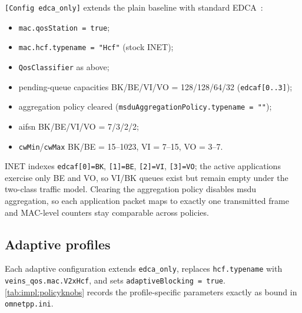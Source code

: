\label{sec:impl:edca}

\texttt{[Config edca\_only]} extends the plain baseline with standard EDCA~\cite{IEEE80211e_2005}:

\begin{itemize}
  \item \texttt{mac.qosStation = true};
  \item \texttt{mac.hcf.typename = "Hcf"} (stock INET);
  \item \texttt{QosClassifier} as above;
  \item pending-queue capacities BK/BE/VI/VO = 128/128/64/32 (\texttt{edcaf[0..3]});
  \item {} aggregation policy cleared (\texttt{msduAggregationPolicy.typename = ""});
  \item \gls{aifsn} BK/BE/VI/VO = 7/3/2/2;
  \item \texttt{cwMin}/\texttt{cwMax} BK/BE = 15--1023, VI = 7--15, VO = 3--7.
\end{itemize}

INET indexes \texttt{edcaf[0]=BK}, \texttt{[1]=BE}, \texttt{[2]=VI}, \texttt{[3]=VO}; the active applications exercise only BE and VO, so VI/BK queues exist but remain empty under the two-class traffic model.
Clearing the aggregation policy disables \gls{msdu} aggregation, so each application packet maps to exactly one transmitted frame and MAC-level counters stay comparable across policies.

\subsection{Adaptive profiles}
\label{sec:impl:adaptive}

Each adaptive configuration extends \texttt{edca\_only}, replaces \texttt{hcf.typename} with \texttt{veins\_qos.mac.V2xHcf}, and sets \texttt{adaptiveBlocking = true}.
\autoref{tab:impl:policyknobs} records the profile-specific parameters exactly as bound in \texttt{omnetpp.ini}.

